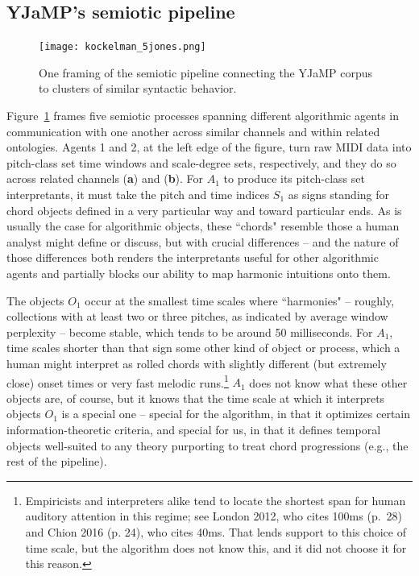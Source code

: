 \subsection{YJaMP's semiotic pipeline}
\begin{landscape}
\begin{figure}
	\centering
	\caption{One framing of the semiotic pipeline connecting the YJaMP corpus to clusters of similar syntactic behavior.}%
	\label{k_j}
	\texttt{[image: kockelman\_5jones.png]}
\end{figure}
\end{landscape}

Figure~\ref{k_j} frames five semiotic processes spanning different algorithmic agents in communication with one another across similar channels and within related ontologies.  Agents 1 and 2, at the left edge of the figure, turn raw MIDI data into pitch-class set time windows and scale-degree sets, respectively, and they do so across related channels (\textbf{a}) and (\textbf{b}).  For $A_1$ to produce its pitch-class set interpretants, it must take the pitch and time indices $S_1$ as signs standing for chord objects defined in a very particular way and toward particular ends.  As is usually the case for algorithmic objects, these ``chords" resemble those a human analyst might define or discuss, but with crucial differences -- and the nature of those differences both renders the interpretants useful for other algorithmic agents and partially blocks our ability to map harmonic intuitions onto them.

The objects $O_1$ occur at the smallest time scales where ``harmonies" -- roughly, collections with at least two or three pitches, as indicated by average window perplexity -- become stable, which tends to be around 50 milliseconds.  For $A_1$, time scales shorter than that sign some other kind of object or process, which a human might interpret as rolled chords with slightly different (but extremely close) onset times or very fast melodic runs.\footnote{Empiricists and interpreters alike tend to locate the shortest span for human auditory attention in this regime; see London 2012, who cites 100ms (p.\ 28) and Chion 2016 (p. 24), who cites 40ms.  That lends support to this choice of time scale, but the algorithm does not know this, and it did not choose it for this reason.}  $A_1$ does not know what these other objects are, of course, but it knows that the time scale at which it interprets objects $O_1$ is a special one -- special for the algorithm, in that it optimizes certain information-theoretic criteria, and special for us, in that it defines temporal objects well-suited to any theory purporting to treat chord progressions (e.g., the rest of the pipeline).

